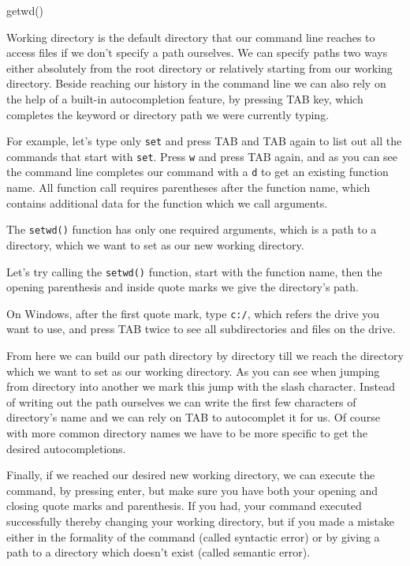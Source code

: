 \documentclass[
]{book}
\newenvironment{Shaded}{\begin{snugshade}}{\end{snugshade}}
\newcommand{\FunctionTok}[1]{\textcolor[rgb]{0.00,0.00,0.00}{#1}}
\newcommand{\NormalTok}[1]{#1}
\begin{document}
\begin{Shaded}
\begin{Highlighting}[]
\FunctionTok{getwd}\NormalTok{()}
\end{Highlighting}
\end{Shaded}

Working directory is the default directory that our command line reaches
to access files if we don't specify a path ourselves. We can specify
paths two ways either absolutely from the root directory or relatively
starting from our working directory. Beside reaching our history in the
command line we can also rely on the help of a built-in autocompletion
feature, by pressing TAB key, which completes the keyword or
directory path we were currently typing.

For example, let's type only \texttt{set} and press TAB and
TAB again to list out all the commands that start with \texttt{set}.
Press \texttt{w} and press TAB again, and as you can see the command
line completes our command with a \texttt{d} to get an existing function name.
All function call requires parentheses after the function name, which
contains additional data for the function which we call arguments.

The \texttt{setwd()} function has only one required arguments, which is a path
to a directory, which we want to set as our new working directory.

Let's try calling the \texttt{setwd()} function, start with the function name,
then the opening parenthesis and inside quote marks we give the
directory's path.

On Windows, after the first quote mark, type \texttt{c:/}, which refers the
drive you want to use, and press TAB twice to see all
subdirectories and files on the drive.

From here we can build our path directory by directory till we reach the
directory which we want to set as our working directory. As you can see
when jumping from directory into another we mark this jump with the
slash character. Instead of writing out the path ourselves we can write
the first few characters of directory's name and we can rely on
TAB to autocomplet it for us. Of course with more common
directory names we have to be more specific to get the desired
autocompletions.

Finally, if we reached our desired new working directory, we can execute
the command, by pressing enter, but make sure you have both your opening
and closing quote marks and parenthesis. If you had, your command
executed successfully thereby changing your working directory, but if
you made a mistake either in the formality of the command (called
syntactic error) or by giving a path to a directory which doesn't exist
(called semantic error).
\end{document}
